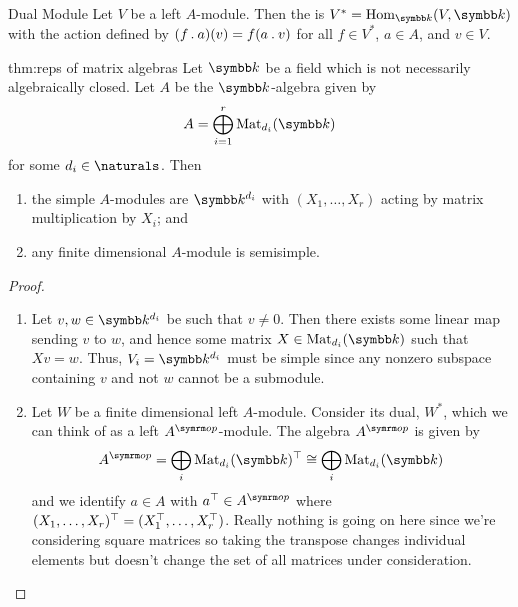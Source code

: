 \begin{dfn}{Dual Module}{}
    Let \(V\) be a left \(A\)-module.
    Then the  is \(V^* = \Hom_{\field}(V, \field)\) with the action defined by \((f \mathbin{.} a)(v) = f(a \mathbin{.} v)\) for all \(f \in V^*\), \(a \in A\), and \(v \in V\).
\end{dfn}

\begin{thm}{}{thm:reps of matrix algebras}
    Let \(\field\) be a field which is not necessarily algebraically closed.
    Let \(A\) be the \(\field\)-algebra given by
    \begin{equation}
        A = \bigoplus_{i=1}^r \matrices{d_i}{\field}
    \end{equation}
    for some \(d_i \in \naturals\).
    Then
    \begin{enumerate}
        \item the simple \(A\)-modules are \(\field^{d_i}\) with \((X_1, \dotsc, X_r)\) acting by matrix multiplication by \(X_i\); and
        \item any finite dimensional \(A\)-module is semisimple.
    \end{enumerate}
    \begin{proof}
        \begin{enumerate}
            \item Let \(v, w \in \field^{d_i}\) be such that \(v \ne 0\).
            Then there exists some linear map sending \(v\) to \(w\), and hence some matrix \(X \in \matrices{d_i}{\field}\) such that \(Xv = w\).
            Thus, \(V_i = \field^{d_i}\) must be simple since any nonzero subspace containing \(v\) and not \(w\) cannot be a submodule.
            \item Let \(W\) be a finite dimensional left \(A\)-module.
            Consider its dual, \(W^*\), which we can think of as a left \(A^{\op}\)-module.
            The algebra \(A^{\op}\) is given by
            \begin{equation}
                A^{\op} = \bigoplus_{i} \matrices{d_i}{\field}^{\trans} \isomorphic \bigoplus_i \matrices{d_i}{\field}
            \end{equation}
            and we identify \(a \in A\) with \(a^{\trans} \in A^{\op}\) where \((X_1, \dotsc, X_r)^{\top} = (X_1^{\top}, \dotsc, X_r^{\top})\).
            Really nothing is going on here since we're considering square matrices so taking the transpose changes individual elements but doesn't change the set of all matrices under consideration.
            

\end{enumerate}
\end{proof}
\end{thm}
